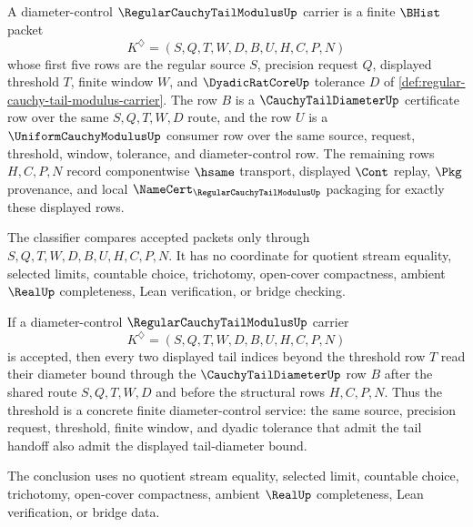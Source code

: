 \begin{definition}
\label{def:regular-cauchy-tail-modulus-diameter-control-carrier}
A diameter-control $\RegularCauchyTailModulusUp$ carrier is a finite $\BHist$ packet
$$
K^{\diamondsuit}=(S,Q,T,W,D,B,U,H,C,P,N)
$$
whose first five rows are the regular source $S$, precision request $Q$, displayed threshold $T$, finite window $W$, and $\DyadicRatCoreUp$ tolerance $D$ of \autoref{def:regular-cauchy-tail-modulus-carrier}. The row $B$ is a $\CauchyTailDiameterUp$ certificate row over the same $S,Q,T,W,D$ route, and the row $U$ is a $\UniformCauchyModulusUp$ consumer row over the same source, request, threshold, window, tolerance, and diameter-control row. The remaining rows $H,C,P,N$ record componentwise $\hsame$ transport, displayed $\Cont$ replay, $\Pkg$ provenance, and local $\NameCert_{\RegularCauchyTailModulusUp}$ packaging for exactly these displayed rows.

The classifier compares accepted packets only through $S,Q,T,W,D,B,U,H,C,P,N$. It has no coordinate for quotient stream equality, selected limits, countable choice, trichotomy, open-cover compactness, ambient $\RealUp$ completeness, Lean verification, or bridge checking.
\end{definition}

\begin{theorem}
\label{thm:regular-cauchy-tail-modulus-diameter-control}
If a diameter-control $\RegularCauchyTailModulusUp$ carrier
$$
K^{\diamondsuit}=(S,Q,T,W,D,B,U,H,C,P,N)
$$
is accepted, then every two displayed tail indices beyond the threshold row $T$ read their diameter bound through the $\CauchyTailDiameterUp$ row $B$ after the shared route $S,Q,T,W,D$ and before the structural rows $H,C,P,N$. Thus the threshold is a concrete finite diameter-control service: the same source, precision request, threshold, finite window, and dyadic tolerance that admit the tail handoff also admit the displayed tail-diameter bound.

The conclusion uses no quotient stream equality, selected limit, countable choice, trichotomy, open-cover compactness, ambient $\RealUp$ completeness, Lean verification, or bridge data.
\end{theorem}

